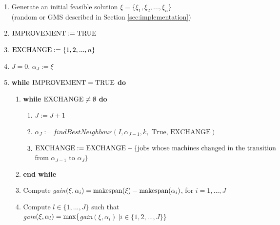 \documentclass[12pt,a4paper,reqno]{article}
\begin{document}
\begin{enumerate}
\item Generate an initial feasible solution $\xi = \{\xi_1,\xi_2,...,\xi_n\}$ \\ (random or GMS described in Section \ref{sec:implementation})
\item $\textnormal{IMPROVEMENT} := \textnormal{TRUE}$
\item[] $\textnormal{EXCHANGE} := \{1,2,...,n\}$
\item[] $J=0$, $\alpha_J := \xi$
\item \textbf{while} $\textnormal{IMPROVEMENT} = \textnormal{TRUE}$ \textbf{do}
\begin{enumerate}
\item \textbf{while} $\textnormal{EXCHANGE} \neq \emptyset$ \textbf{do}
\begin{enumerate}
\item $J := J+1$
\item $\alpha_J := findBestNeighbour(I,\alpha_{J-1},k,\text{ True, EXCHANGE})$
\item $\textnormal{EXCHANGE} := \textnormal{EXCHANGE} - \{\text{jobs whose machines changed in the transition}$\\
\hspace*{6cm} from $\alpha_{J-1} \text{ to } \alpha_{J}\} $
\end{enumerate}
\item[] \textbf{end while}
\item Compute \textit{gain}$(\xi,\alpha_i) = \textnormal{makespan}(\xi) - \textnormal{makespan}(\alpha_i)$, for $i=1,...,J$
\item Compute $l \in \{1,...,J\}$ such that \\ \textit{gain}$(\xi,\alpha_l) = \textnormal{max}\{$\textit{gain}$(\xi,\alpha_i) \> | i \in \{1,2,...,J\} \}$

\end{enumerate}
\end{enumerate}
\end{document}

